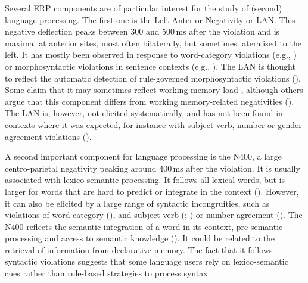 \documentclass[output=paper,colorlinks,citecolor=brown,modfonts,nonflat]{../langscibook}
\begin{document}
Several ERP components are of particular interest for the study of (second) language processing. The first one is the Left-Anterior Negativity or LAN. This negative deflection peaks between 300 and 500\,ms after the violation and is maximal at anterior sites, most often bilaterally, but sometimes lateralised to the left. It has mostly been observed in response to word-category violations (e.g., \citealt{Weber-FoxNeville1996,IselEtAl2007,BowdenEtAl2013}) or morphosyntactic violations in sentence contexts (e.g., \citealt{OjimaEtAl2005,RossiEtAl2006,ChenEtAl2007,Gillon-DowensEtAl2010,MolinaroEtAl2011,Alemán-BañónEtAl2014}). The LAN is thought to reflect the automatic detection of rule-governed morphosyntactic violations (\citealt{GunterEtAl2000,Morgan-ShortEtAl2015}). Some claim that it may sometimes reflect working memory load \citep{Kaan2007}, although others argue that this component differs from working memory-related negativities (\citealt{Martín-LoechesEtAl2005}). The LAN is, however, not elicited systematically, and has not been found in contexts where it was expected, for instance with subject-verb, number or gender agreement violations (\citealt{BondEtAl2011,FoucartFrenck-Mestre2012}).

A second important component for language processing is the N400, a large centro-parietal negativity peaking around 400\,ms after the violation. It is usually associated with lexico-semantic processing. It follows all lexical words, but is larger for words that are hard to predict or integrate in the context (\citealt{KutasHillyard1980,Federmeier2007,KutasEtAl2011}). However, it can also be elicited by a large range of syntactic incongruities, such as violations of word category (\citealt{Weber-FoxNeville1996,GuoEtAl2009,Kotz2009}), and subject-verb (\citealt{XueEtAl2013}; \citealt{TannerHell2014,TannerEtAl2014}) or number agreement (\citealt{OsterhoutEtAl2006,BatterinkNeville2013}). The N400 reflects the semantic integration of a word in its context, pre-semantic processing and access to semantic knowledge (\citealt{Morgan-ShortEtAl2015,Isel2017}). It could be related to the retrieval of information from declarative memory. The fact that it follows syntactic violations suggests that some language users rely on lexico-semantic cues rather than rule-based strategies to process syntax.
\end{document}

